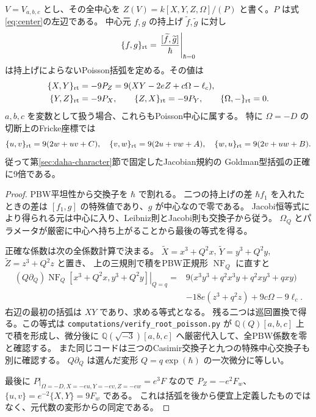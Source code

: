 \begin{theorem}
\label{thm:root-poisson-goldman}
$V=V_{a,b,c}$ とし、その全中心を
$Z(V)=k[X,Y,Z,\Omega]/(P)$ と書く。$P$ は式\eqref{eq:center}の左辺である。
中心元 $f,g$ の持上げ $\widetilde f,\widetilde g$ に対し
\[
 \{f,g\}_{\rm rt}=\left.\frac{[\widetilde f,\widetilde g]}{\hbar}\right|_{\hbar=0}
\]
は持上げによらないPoisson括弧を定める。その値は
\begin{equation}\label{eq:root-poisson-center}
 \begin{aligned}
 \{X,Y\}_{\rm rt}&=-9P_Z=9(XY-2eZ+c\Omega-\ell_c),\\
 \{Y,Z\}_{\rm rt}&=-9P_X,\qquad
 \{Z,X\}_{\rm rt}=-9P_Y,\qquad
 \{\Omega,-\}_{\rm rt}=0.
 \end{aligned}
\end{equation}
$a,b,c$ を変数として扱う場合、これらもPoisson中心に属する。
特に $\Omega=-D$ の切断上のFricke座標では
\begin{equation}\label{eq:root-goldman-nine}
 \{u,v\}_{\rm rt}=9(2w+uv+C),\quad
 \{v,w\}_{\rm rt}=9(2u+vw+A),\quad
 \{w,u\}_{\rm rt}=9(2v+uw+B).
\end{equation}
従って第\ref{sec:daha-character}節で固定したJacobian規約の
Goldman型括弧の正確に9倍である。
\end{theorem}
\begin{proof}
PBW平坦性から交換子を $\hbar$ で割れる。
二つの持上げの差 $\hbar f_1$ を入れたときの差は
$[f_1,g]$ の特殊値であり、$g$ が中心なので零である。
Jacobi恒等式により得られる元は中心に入り、Leibniz則とJacobi則も交換子から従う。
$\Omega_Q$ とパラメータが厳密に中心へ持ち上がることから最後の等式を得る。

正確な係数は次の全係数計算で決まる。
$\widetilde X=x^3+Q^2x$, $\widetilde Y=y^3+Q^2y$, $\widetilde Z=z^3+Q^2z$ と置き、
上の三規則で積をPBW正規形 $\operatorname{NF}_Q$ に直すと
\begin{align*}
 \left.(Q\partial_Q)\operatorname{NF}_Q
   [x^3+Q^2x,y^3+Q^2y]\right|_{Q=q}
  ={}&9\bigl(x^3y^3+q^2x^3y+q^2xy^3+qxy\bigr)\\
   &-18e(z^3+q^2z)+9c\Omega-9\ell_c.
\end{align*}
右辺の最初の括弧は $XY$ であり、求める等式となる。
残る二つは巡回置換で得る。この等式は
\texttt{computations/verify\_root\_poisson.py} が
$\mathbb Q(Q)[a,b,c]$ 上で積を形成し、微分後に
$\mathbb Q(\sqrt{-3})[a,b,c]$ へ厳密代入して、全PBW係数を零と確認する。
また同じコードは三つのCasimir交換子と九つの特殊中心交換子も別に確認する。
$Q\partial_Q$ は選んだ変形 $Q=q\exp(\hbar)$ の一次微分に等しい。

最後に $P|_{\Omega=-D,X=-eu,Y=-ev,Z=-ew}=e^3F$ なので
$P_Z=-e^2F_w$、$\{u,v\}=e^{-2}\{X,Y\}=9F_w$ である。
これは括弧を後から便宜上定義したものではなく、元代数の変形からの同定である。
\end{proof}

